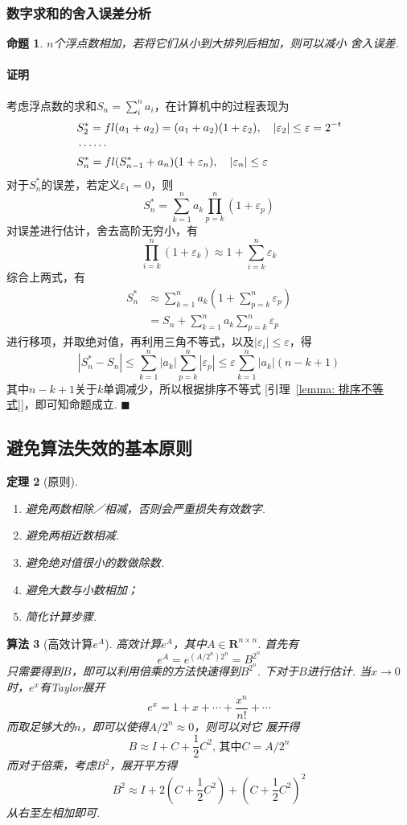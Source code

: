 \documentclass[12pt, a4paper]{article}
\theoremstyle{margin}
\newtheorem{thm}{定理}
\newtheorem{pos}[thm]{命题}
\newtheorem{alg}[thm]{算法}
\newcommand{\fl}{\mathnormal{fl}}
\newcommand{\R}{\mathbf{R}}
\newcommand{\str}{^*}
\newcommand{\vep}{\varepsilon}
\newcommand\lemmaref[1]{引理~\ref{#1}}
\newcommand{\proof}{\paragraph{证明}}
\begin{document}
\subsubsection{数字求和的舍入误差分析}
  \begin{pos}
    $n$个浮点数相加，若将它们从小到大排列后相加，则可以减小
    舍入误差.
  \end{pos}
  \proof
    考虑浮点数的求和$S_n=\sum_i^n a_i$，在计算机中的过程表现为
    \[\begin{split}
      & S_2^* = \fl(a_1+a_2)=(a_1+a_2)(1+\vep_2),\quad|\vep_2|\le\vep=2^{-t}\\
      & \cdots\cdots\\
      & S_n^* = \fl(S_{n-1}^*+a_n)(1+\vep_n),\quad|\vep_n|\le\vep
    \end{split}\]
    对于$S_n\str$的误差，若定义$\vep_1=0$，则
    \[
      S_n\str=\sum_{k=1}^n a_k\prod_{p=k}^n(1+\vep_p)
    \]
    对误差进行估计，舍去高阶无穷小，有
    \[
      \prod_{i=k}^n(1+\vep_k)\approx1+\sum_{i=k}^n\vep_k
    \]
    综合上两式，有
    \[\begin{split}
      S_n\str & \approx\sum_{k=1}^na_k(1+\sum_{p=k}^n\vep_p)\\
      & = S_n + \sum_{k=1}^na_k\sum_{p=k}^n\vep_p
    \end{split}\]
    进行移项，并取绝对值，再利用三角不等式，以及$|\vep_i|\le\vep$，得
    \[
      \left|S_n\str-S_n\right|
      \le \sum_{k=1}^n|a_k|\sum_{p=k}^n|\vep_p|
      \le \vep\sum_{k=1}^n|a_k|(n-k+1)
    \]
    其中$n-k+1$关于$k$单调减少，所以根据排序不等式
    [\lemmaref{lemma: 排序不等式}]，即可知命题成立. $\blacksquare$

\newpage
\subsection{避免算法失效的基本原则}
  \begin{thm}[原则]
    $\,$
    \begin{enumerate}
      \item 避免两数相除／相减，否则会严重损失有效数字.
      \item 避免两相近数相减.
      \item 避免绝对值很小的数做除数.
      \item 避免大数与小数相加；
      \item 简化计算步骤.
    \end{enumerate}
  \end{thm}


  \begin{alg}[高效计算$e^A$]
    高效计算$e^A$，其中$A\in\R^{n\times n}$. 首先有
    \[
      e^A = e^{(A/2^n)2^n} = B^{2^n}
    \]
    只需要得到$B$，即可以利用倍乘的方法快速得到$B^{2^n}$.
    下对于$B$进行估计. 当$x\to0$时，$e^x$有Taylor展开
    \[
      e^x = 1 + x + \cdots + \frac{x^n}{n!} + \cdots
    \]
    而取足够大的$n$，即可以使得$A/2^n\approx0$，则可以对它
    展开得
    \[
      B \approx I + C + \frac{1}{2}C^2,\,\text{其中}
      C = A/2^n
    \]
    而对于倍乘，考虑$B^2$，展开平方得
    \[
      B^2 \approx I + 2(C+\frac{1}{2}C^2) + (C+\frac{1}{2}C^2)^2
    \]
    从右至左相加即可.
  \end{alg}
\end{document}

